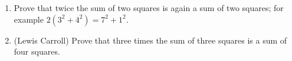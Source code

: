 \begin{enumerate}
\item[(a)] Prove that twice the sum of two squares is again a sum of two squares; for example $2\left(3^2+4^2\right)=7^2+1^2$.
\item[(b)] (Lewis Carroll) Prove that three times the sum of three squares is a sum of four squares.
\end{enumerate}

